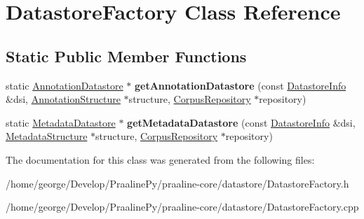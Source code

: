 \hypertarget{class_datastore_factory}{}\section{Datastore\+Factory Class Reference}
\label{class_datastore_factory}
\subsection*{Static Public Member Functions}
\begin{DoxyCompactItemize}
\item 
\mbox{\label{class_datastore_factory_a59691abd37f28aac6c7f3b20f1360059}} 
static \hyperlink{class_annotation_datastore}{Annotation\+Datastore} $\ast$ {\bfseries get\+Annotation\+Datastore} (const \hyperlink{class_datastore_info}{Datastore\+Info} \&dsi, \hyperlink{class_annotation_structure}{Annotation\+Structure} $\ast$structure, \hyperlink{class_corpus_repository}{Corpus\+Repository} $\ast$repository)
\item 
\mbox{\label{class_datastore_factory_a6763f50d61237fcfcd8d803c1dccead5}} 
static \hyperlink{class_metadata_datastore}{Metadata\+Datastore} $\ast$ {\bfseries get\+Metadata\+Datastore} (const \hyperlink{class_datastore_info}{Datastore\+Info} \&dsi, \hyperlink{class_metadata_structure}{Metadata\+Structure} $\ast$structure, \hyperlink{class_corpus_repository}{Corpus\+Repository} $\ast$repository)
\end{DoxyCompactItemize}


The documentation for this class was generated from the following files\+:\begin{DoxyCompactItemize}
\item 
/home/george/\+Develop/\+Praaline\+Py/praaline-\/core/datastore/Datastore\+Factory.\+h\item 
/home/george/\+Develop/\+Praaline\+Py/praaline-\/core/datastore/Datastore\+Factory.\+cpp\end{DoxyCompactItemize}

